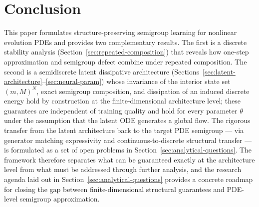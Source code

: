 \documentclass[11pt]{article}
\begin{document}
\section{Conclusion}
This paper formulates structure-preserving semigroup learning for nonlinear evolution PDEs and provides two complementary results. The first is a discrete stability analysis (Section~\ref{sec:repeated-composition}) that reveals how one-step approximation and semigroup defect combine under repeated composition. The second is a semidiscrete latent dissipative architecture (Sections~\ref{sec:latent-architecture}--\ref{sec:neural-param}) whose invariance of the interior state set \((m,M)^N\), exact semigroup composition, and dissipation of an induced discrete energy hold by construction at the finite-dimensional architecture level; these guarantees are independent of training quality and hold for every parameter \(\theta\) under the assumption that the latent ODE generates a global flow. The rigorous transfer from the latent architecture back to the target PDE semigroup — via generator matching expressivity and continuous-to-discrete structural transfer — is formulated as a set of open problems in Section~\ref{sec:analytical-questions}. The framework therefore separates what can be guaranteed exactly at the architecture level from what must be addressed through further analysis, and the research agenda laid out in Section~\ref{sec:analytical-questions} provides a concrete roadmap for closing the gap between finite-dimensional structural guarantees and PDE-level semigroup approximation.
\end{document}
